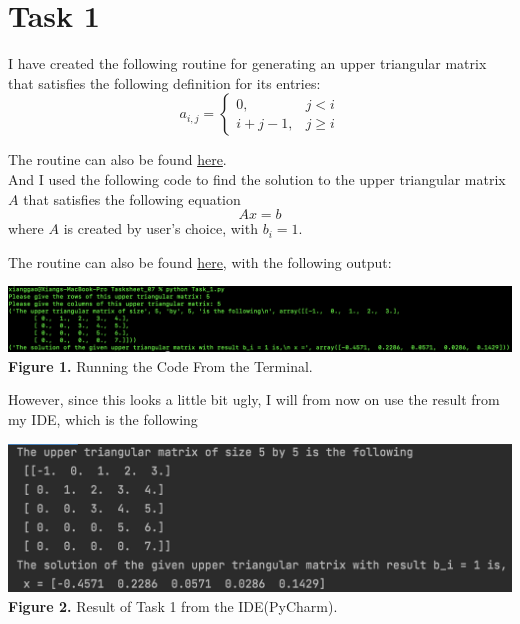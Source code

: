 \documentclass{article}
\begin{document}
\section*{Task 1}
I have created the following routine for generating an upper triangular matrix that satisfies the following definition for its entries:
$$a_{i, j} = \begin{cases} 0, & j < i \\ i + j - 1, & j \geqslant i\end{cases}$$

The routine can also be found \href{https://github.com/GoByMark/math4610/blob/main/Homework_Tasks/Tasksheet_07/src/matrixU.py}{here}.\\
And I used the following code to find the solution to the upper triangular matrix $A$ that satisfies the following equation 
$$A x = b$$
where $A$ is created by user's choice, with $b_i = 1$. 

The routine can also be found \href{https://github.com/GoByMark/math4610/blob/main/Homework_Tasks/Tasksheet_07/src/Task_1.py}{here}, with the following output:
\begin{center}
\includegraphics[width=\textwidth]{Screenshots/1.png}
{\bf Figure 1.} Running the Code From the Terminal.
\end{center}
\newpage
\raggedright However, since this looks a little bit ugly, I will from now on use the result from my IDE, which is the following
\begin{center}
\includegraphics[width=\textwidth]{Screenshots/1better.png}
{\bf Figure 2.} Result of Task 1 from the IDE(PyCharm).
\end{center}
\end{document}
